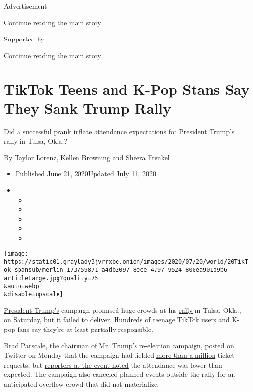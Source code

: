 Advertisement

\protect\hyperlink{after-top}{Continue reading the main story}

Supported by

\protect\hyperlink{after-sponsor}{Continue reading the main story}

\hypertarget{tiktok-teens-and-k-pop-stans-say-they-sank-trump-rally}{%
\section{TikTok Teens and K-Pop Stans Say They Sank Trump
Rally}\label{tiktok-teens-and-k-pop-stans-say-they-sank-trump-rally}}

Did a successful prank inflate attendance expectations for President
Trump's rally in Tulsa, Okla.?

By \href{https://www.nytimes3xbfgragh.onion/by/taylor-lorenz}{Taylor
Lorenz},
\href{https://www.nytimes3xbfgragh.onion/by/kellen-browning}{Kellen
Browning} and
\href{https://www.nytimes3xbfgragh.onion/by/sheera-frenkel}{Sheera
Frenkel}

\begin{itemize}
\item
  Published June 21, 2020Updated July 11, 2020
\item
  \begin{itemize}
  \item
  \item
  \item
  \item
  \item
  \end{itemize}
\end{itemize}

\texttt{[image: https://static01.graylady3jvrrxbe.onion/images/2020/07/20/world/20TikTok-spansub/merlin\_173759871\_a4db2097-8ece-4797-9524-800ea901b9b6-articleLarge.jpg?quality=75\\\&auto=webp\\\&disable=upscale]}

\href{https://www.nytimes3xbfgragh.onion/2020/06/22/style/trump-tulsa-tie.html}{President
Trump's} campaign promised huge crowds at his
\href{https://www.nytimes3xbfgragh.onion/2020/07/08/us/politics/trump-rally-portsmouth-new-hampshire.html}{rally}
in Tulsa, Okla., on Saturday, but it failed to deliver. Hundreds of
teenage
\href{https://www.nytimes3xbfgragh.onion/2020/08/03/technology/trump-tiktok-microsoft.html}{TikTok}
users and K-pop fans say they're at least partially responsible.

Brad Parscale, the chairman of Mr. Trump's re-election campaign, posted
on Twitter on Monday that the campaign had fielded
\href{https://twitter.com/parscale/status/1272543199647666176?s=20}{more
than a million} ticket requests, but
\href{https://twitter.com/AsteadWesley/status/1274465912951844866?s=20}{reporters
at the event noted} the attendance was lower than expected. The campaign
also canceled planned events outside the rally for an anticipated
overflow crowd that did not materialize.

